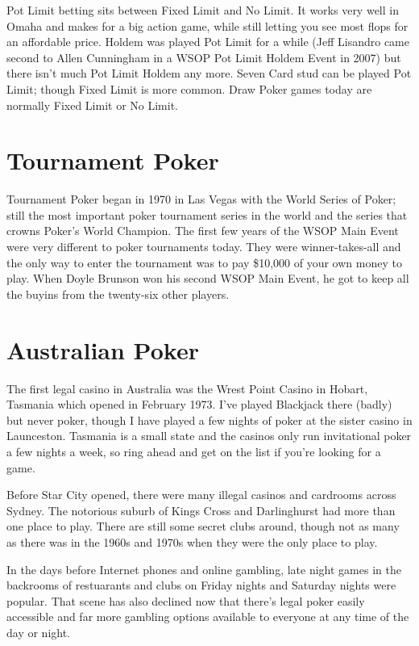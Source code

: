 Pot Limit betting sits between Fixed Limit and No Limit. It works very
well in Omaha and makes for a big action game, while still letting you
see most flops for an affordable price. Holdem was played Pot Limit for
a while (Jeff Lisandro came second to Allen Cunningham in a WSOP Pot Limit
Holdem Event in 2007) but there isn't much Pot Limit Holdem any more.
Seven Card stud can be played Pot Limit; though Fixed Limit
is more common. Draw Poker games today are normally Fixed Limit or No Limit.

\section{Tournament Poker}

Tournament Poker began in 1970 in Las Vegas with the World Series of
Poker; still the most important poker tournament series in the world
and the series that crowns Poker's World Champion. The first few years
of the WSOP Main Event were very different to poker tournaments today.
They were winner-takes-all and the only way to enter the
tournament was to pay \$10,000 of your own money to play.
When Doyle Brunson won his second WSOP Main Event, he got to keep
all the buyins from the twenty-six other players.

\section{Australian Poker}

The first legal casino in Australia was the Wrest Point Casino in
Hobart, Tasmania which opened in February 1973. I've played Blackjack
there (badly) but never poker, though I have played a few nights of
poker at the sister casino in Launceston. Tasmania is a small state
and the casinos only run invitational poker a few nights a week, so
ring ahead and get on the list if you're looking for a game.

Before Star City opened, there were many illegal casinos and
cardrooms across Sydney. The notorious suburb of Kings Cross and
Darlinghurst had more than one place to play. There are still some
secret clubs around, though not as many as there was in
the 1960s and 1970s when they were the only place to play.

In the days before Internet phones and online gambling, late night
games in the backrooms of restuarants and clubs on Friday nights and
Saturday nights were popular. That scene has also declined now that
there's legal poker easily accessible and far more gambling options
available to everyone at any time of the day or night.

